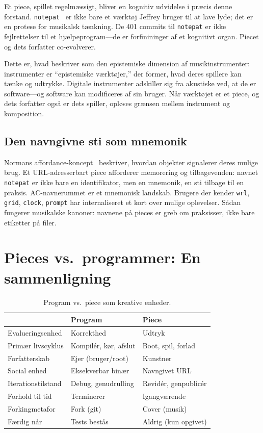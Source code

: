 \documentclass[10pt,letterpaper,twocolumn]{article}
\begin{document}
Et piece, spillet regelmæssigt, bliver en kognitiv udvidelse i præcis denne forstand. \texttt{notepat}~\citep{scudder2026notepat} er ikke bare et værktøj Jeffrey bruger til at lave lyde; det er en protese for musikalsk tænkning. De 401 commits til \texttt{notepat} er ikke fejlrettelser til et hjælpeprogram---de er forfinininger af et kognitivt organ. Piecet og dets forfatter co-evolverer.

Dette er, hvad \citet{magnusson2010designing} beskriver som den epistemiske dimension af musikinstrumenter: instrumenter er ``epistemiske værktøjer,'' der former, hvad deres spillere kan tænke og udtrykke. Digitale instrumenter adskiller sig fra akustiske ved, at de er software---og software kan modificeres af sin bruger. Når værktøjet er et piece, og dets forfatter også er dets spiller, opløses grænsen mellem instrument og komposition.

\subsection{Den navngivne sti som mnemonik}

Normans affordance-koncept~\citep{norman1988design} beskriver, hvordan objekter signalerer deres mulige brug. Et URL-adresserbart piece afforderer memorering og tilbagevenden: navnet \texttt{notepat} er ikke bare en identifikator, men en mnemonik, en sti tilbage til en praksis. AC-navnerummet er et mnemonisk landskab. Brugere der kender \texttt{wrl}, \texttt{grid}, \texttt{clock}, \texttt{prompt} har internaliseret et kort over mulige oplevelser. Sådan fungerer musikalske kanoner: navnene på pieces er greb om praksisser, ikke bare etiketter på filer.

\section{Pieces vs.\ programmer: En sammenligning}

\begin{table}[h]
\small\centering
\begin{tabularx}{\columnwidth}{l X X}
\toprule
 & \textbf{Program} & \textbf{Piece} \\
\midrule
Evalueringsenhed & Korrekthed & Udtryk \\
Primær livscyklus & Kompilér, kør, afslut & Boot, spil, forlad \\
Forfatterskab & Ejer (bruger/root) & Kunstner \\
Social enhed & Eksekverbar binær & Navngivet URL \\
Iterationstilstand & Debug, genudrulling & Revidér, genpublicér \\
Forhold til tid & Terminerer & Igangværende \\
Forkingmetafor & Fork (git) & Cover (musik) \\
Færdig når & Tests bestås & Aldrig (kun opgivet) \\
\bottomrule
\end{tabularx}
\caption{Program vs.\ piece som kreative enheder.}
\label{tab:comparison}
\end{table}
\end{document}
